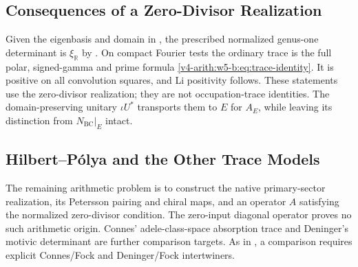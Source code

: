 \subsection{Consequences of a Zero-Divisor Realization}
\label{v4-arith:w5-b:form:layer-2}

Given the eigenbasis and domain in
, the prescribed normalized
genus-one determinant is $\xi_{\mathbb R}$ by
. On compact Fourier tests the
ordinary trace is the full polar, signed-gamma and prime formula
\eqref{v4-arith:w5-b:eq:trace-identity}. It is positive on all
convolution squares, and Li positivity follows. These statements
use the zero-divisor realization; they are not occupation-trace
identities. The domain-preserving unitary $\iota U^*$ transports
them to $E$ for $A_E$, while leaving its distinction from
$N_{\mathrm{BC}}|_E$ intact.

\subsection{Hilbert--P\'olya and the Other Trace Models}
\label{v4-arith:w5-b:form:layer-3}

The remaining arithmetic problem is to construct the native
primary-sector realization, its Petersson pairing and chiral maps,
and an operator $A$ satisfying the normalized zero-divisor
condition. The zero-input diagonal operator proves no such
arithmetic origin. Connes' adele-class-space absorption trace and
Deninger's motivic determinant are further comparison targets.
As in , a comparison
requires explicit Connes/Fock and Deninger/Fock intertwiners.

